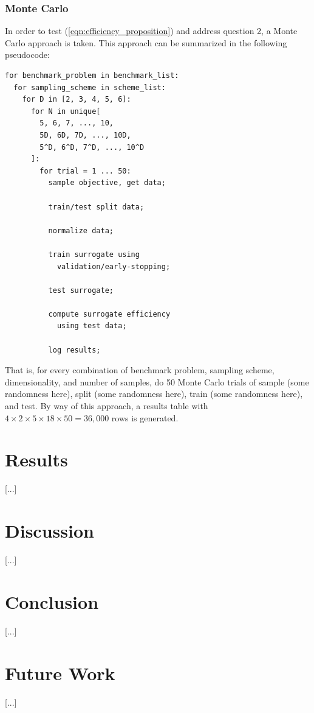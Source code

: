 \documentclass[conference]{IEEEtran}
\begin{document}
\subsubsection{Monte Carlo}

In order to test (\ref{eqn:efficiency_proposition}) and address question 2, a Monte Carlo approach is taken. This approach can be summarized in the following pseudocode:

\begin{verbatim}
for benchmark_problem in benchmark_list:
  for sampling_scheme in scheme_list:
    for D in [2, 3, 4, 5, 6]:
      for N in unique[
      	5, 6, 7, ..., 10,
      	5D, 6D, 7D, ..., 10D,
      	5^D, 6^D, 7^D, ..., 10^D
      ]:
        for trial = 1 ... 50:
          sample objective, get data;
      
          train/test split data;
      
          normalize data;
      
          train surrogate using
            validation/early-stopping;
        
          test surrogate;
        
          compute surrogate efficiency
            using test data;
        
          log results;
\end{verbatim}

\noindent That is, for every combination of benchmark problem, sampling scheme, dimensionality, and number of samples, do 50 Monte Carlo trials of sample (some randomness here), split (some randomness here), train (some randomness here), and test. By way of this approach, a results table with $4\times 2\times 5\times 18\times 50 = 36,000$ rows is generated.

\section{Results}

[...]

\section{Discussion}

[...]

\section{Conclusion}

[...]

\section{Future Work}

[...]



{}

\end{document}
